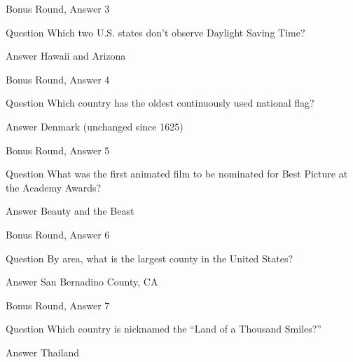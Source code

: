 \documentclass[11pt]{beamer}
\begin{document}
\begin{frame}[t]{Bonus Round, Answer 3}
\vspace{2em}
\begin{block}{Question}
Which two U.S. states don't observe Daylight Saving Time\@?
\end{block}
\pause{}
\begin{block}{Answer}
Hawaii and Arizona
\end{block}
\end{frame}
    

\begin{frame}[t]{Bonus Round, Answer 4}
\vspace{2em}
\begin{block}{Question}
Which country has the oldest continuously used national flag\@?
\end{block}
\pause{}
\begin{block}{Answer}
Denmark (unchanged since 1625)
\end{block}
\end{frame}
    

\begin{frame}[t]{Bonus Round, Answer 5}
\vspace{2em}
\begin{block}{Question}
What was the first animated film to be nominated for Best Picture at the Academy Awards\@?
\end{block}
\pause{}
\begin{block}{Answer}
Beauty and the Beast
\end{block}
\end{frame}
    

\begin{frame}[t]{Bonus Round, Answer 6}
\vspace{2em}
\begin{block}{Question}
By area, what is the largest county in the United States\@?
\end{block}
\pause{}
\begin{block}{Answer}
San Bernadino County, CA
\end{block}
\end{frame}
    

\begin{frame}[t]{Bonus Round, Answer 7}
\vspace{2em}
\begin{block}{Question}
Which country is nicknamed the ``Land of a Thousand Smiles?''
\end{block}
\pause{}
\begin{block}{Answer}
Thailand
\end{block}
\end{frame}
    
\end{document}

